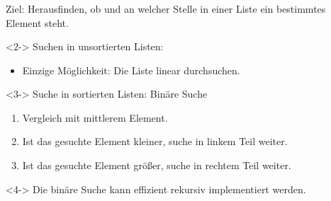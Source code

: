 \begin{frame}
\frametitle{\insertsection}
\begin{block}
{Ziel: Herausfinden, ob und an welcher Stelle in einer Liste ein bestimmtes Element steht.}
\end{block}
\vspace{-1em}
\begin{block}<2->
{Suchen in unsortierten Listen:}
\begin{itemize}
	\item Einzige Möglichkeit: Die Liste linear durchsuchen.
\end{itemize}
\end{block}
\begin{block}<3->
{Suche in sortierten Listen: \alert{Binäre Suche}}
\begin{enumerate}
	\item Vergleich mit mittlerem Element.
	\item Ist das gesuchte Element kleiner, suche in linkem Teil weiter.
	\item Ist das gesuchte Element größer, suche in rechtem Teil weiter.
\end{enumerate}
\end{block}
\begin{block}<4->
{Die binäre Suche kann effizient \alert{rekursiv} implementiert werden.}
\end{block}
\end{frame}

\endinput

\begin{frame}
\frametitle{\insertsection}
\begin{block}
{}
\end{block}
\end{frame}